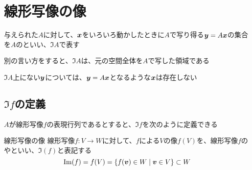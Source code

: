 \documentclass[../../../topic_linear-algebra]{subfiles}
\begin{document}
\sectionline
\section{線形写像の像}

与えられた$A$に対して、$\vb*{x}$をいろいろ動かしたときに$A$で写り得る$\vb*{y} = A\vb*{x}$の集合を$A$のといい、$\Im A$で表す

\br

別の言い方をすると、$\Im A$は、元の空間全体を$A$で写した領域である

$\Im A$上にない$\vb*{y}$については、$\vb*{y} = A\vb*{x}$となるような$\vb*{x}$は存在しない

\subsection{$\Im f$の定義}

$A$が線形写像$f$の表現行列であるとすると、$\Im f$を次のように定義できる

\begin{definition*}{線形写像の像}
  線形写像$f\colon V \to W$に対して、$f$による$V$の像$f(V)$を、線形写像$f$のやといい、$\Im(f)$と表記する
  \begin{equation*}
    \Im(f) = f(V) = \{ f(\vb*{v}) \in W \mid \vb*{v} \in V \} \subset W
  \end{equation*}
\end{definition*}
\end{document}
